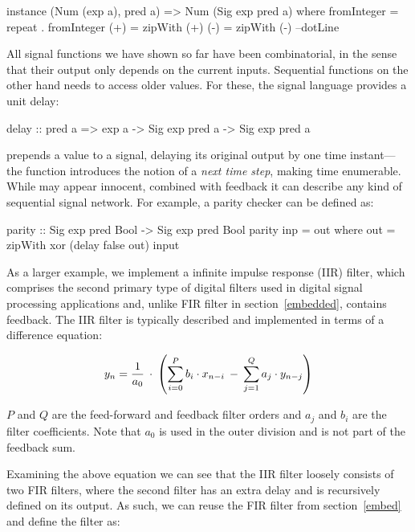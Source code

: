 \documentclass[../paper.tex]{subfiles}
\begin{document}
\begin{code}
instance (Num (exp a), pred a) => Num (Sig exp pred a) where
  fromInteger = repeat . fromInteger
  (+)         = zipWith (+)
  (-)         = zipWith (-)
  --dotLine
\end{code}

All signal functions we have shown so far have been combinatorial, in the sense that their output only depends on the current inputs. Sequential functions on the other hand needs to access older values. For these, the signal language provides a unit delay:

\begin{code}
delay :: pred a => exp a -> Sig exp pred a -> Sig exp pred a
\end{code}

\noindent {} prepends a value to a signal, delaying its original output by one time instant---the function introduces the notion of a \emph{next time step}, making time enumerable. While  may appear innocent, combined with feedback it can describe any kind of sequential signal network. For example, a parity checker can be defined as:

\begin{code}
parity :: Sig exp pred Bool -> Sig exp pred Bool
parity inp = out where
  out = zipWith xor (delay false out) input
\end{code}

As a larger example, we implement a infinite impulse response (IIR) filter, which comprises the second primary type of digital filters used in digital signal processing applications and, unlike FIR filter in section~\ref{embedded}, contains feedback. The IIR filter is typically described and implemented in terms of a difference equation:

\begin{equation}
y_{n} = {1 \over a_{0}} \: \cdot \: \left( \sum_{i=0}^{P} b_{i} \cdot x_{n-i} \: - \: \sum_{j=1}^{Q} a_{j} \cdot y_{n-j} \right)
\end{equation}
\vspace{1mm}

\noindent $P$ and $Q$ are the feed-forward and feedback filter orders and $a_{j}$ and $b_{i}$ are the filter coefficients. Note that $a_{0}$ is used in the outer division and is not part of the feedback sum.

Examining the above equation we can see that the IIR filter loosely consists of two FIR filters, where the second filter has an extra delay and is recursively defined on its output. As such, we can reuse the FIR filter from section~\ref{embed} and define the filter as:
\end{document}
